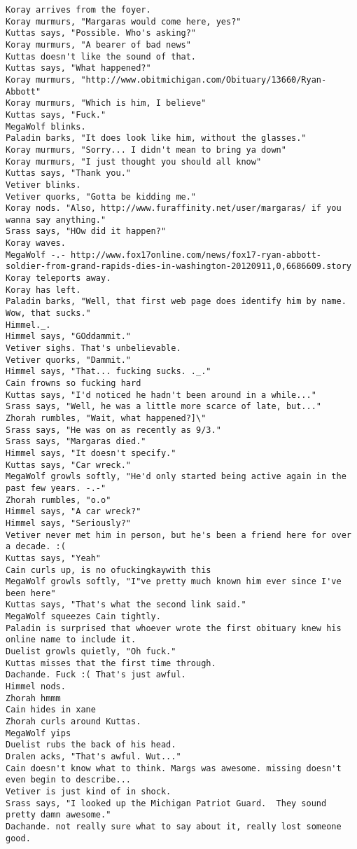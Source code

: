 \begin{verbatim}
Koray arrives from the foyer.
Koray murmurs, "Margaras would come here, yes?"
Kuttas says, "Possible. Who's asking?"
Koray murmurs, "A bearer of bad news"
Kuttas doesn't like the sound of that.
Kuttas says, "What happened?"
Koray murmurs, "http://www.obitmichigan.com/Obituary/13660/Ryan-Abbott"
Koray murmurs, "Which is him, I believe"
Kuttas says, "Fuck."
MegaWolf blinks.
Paladin barks, "It does look like him, without the glasses."
Koray murmurs, "Sorry... I didn't mean to bring ya down"
Koray murmurs, "I just thought you should all know"
Kuttas says, "Thank you."
Vetiver blinks.
Vetiver quorks, "Gotta be kidding me."
Koray nods. "Also, http://www.furaffinity.net/user/margaras/ if you wanna say anything."
Srass says, "HOw did it happen?"
Koray waves.
MegaWolf -.- http://www.fox17online.com/news/fox17-ryan-abbott-soldier-from-grand-rapids-dies-in-washington-20120911,0,6686609.story
Koray teleports away.
Koray has left.
Paladin barks, "Well, that first web page does identify him by name. Wow, that sucks."
Himmel._.
Himmel says, "GOddammit."
Vetiver sighs. That's unbelievable.
Vetiver quorks, "Dammit."
Himmel says, "That... fucking sucks. ._."
Cain frowns so fucking hard
Kuttas says, "I'd noticed he hadn't been around in a while..."
Srass says, "Well, he was a little more scarce of late, but..."
Zhorah rumbles, "Wait, what happened?]\"
Srass says, "He was on as recently as 9/3."
Srass says, "Margaras died."
Himmel says, "It doesn't specify."
Kuttas says, "Car wreck."
MegaWolf growls softly, "He'd only started being active again in the past few years. -.-"
Zhorah rumbles, "o.o"
Himmel says, "A car wreck?"
Himmel says, "Seriously?"
Vetiver never met him in person, but he's been a friend here for over a decade. :(
Kuttas says, "Yeah"
Cain curls up, is no ofuckingkaywith this
MegaWolf growls softly, "I"ve pretty much known him ever since I've been here"
Kuttas says, "That's what the second link said."
MegaWolf squeezes Cain tightly.
Paladin is surprised that whoever wrote the first obituary knew his online name to include it.
Duelist growls quietly, "Oh fuck."
Kuttas misses that the first time through.
Dachande. Fuck :( That's just awful.
Himmel nods.
Zhorah hmmm
Cain hides in xane
Zhorah curls around Kuttas.
MegaWolf yips
Duelist rubs the back of his head.
Dralen acks, "That's awful. Wut..."
Cain doesn't know what to think. Margs was awesome. missing doesn't even begin to describe...
Vetiver is just kind of in shock.
Srass says, "I looked up the Michigan Patriot Guard.  They sound pretty damn awesome."
Dachande. not really sure what to say about it, really lost someone good.

\end{verbatim}
